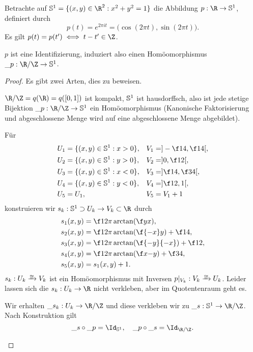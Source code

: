 \begin{ex}
	Betrachte auf $\S^1 = \{ (x,y) \in \R^2 : x^2 + y^2 = 1 \}$ die Abbildung $p: \R \to \S^1$, definiert durch
	\[
		p(t) = e^{2\pi i t} = \Big( \cos(2\pi t), \sin(2\pi t) \Big).
	\]
	Es gilt $p(t) = p(t') \iff t - t' \in \Z$.

	$p$ ist eine Identifizierung, induziert also einen Homöomorphismus $\_p : \R / \Z \to \S^1$.
	\begin{proof}
		Es gibt zwei Arten, dies zu beweisen.
		\begin{seg}
			$\R / \Z = q(\R) = q([0,1])$ ist kompakt, $\S^1$ ist hausdorffsch, also ist jede stetige Bijektion $\_p: \R / \Z \to \S^1$ ein Homöomorphismus (Kanonische Faktorisierung und abgeschlossene Menge wird auf eine abgeschlossene Menge abgebildet).
		\end{seg}
		\begin{seg}
			Für
			\begin{align*}
				U_1 &= \{ (x,y) \in \S^1 : x > 0 \},&
				V_1 &= ] - \f 14, \f 14 [, \\
				U_2 &= \{ (x,y) \in \S^1 : y > 0 \},&
				V_2 &= ] 0, \f 12 [, \\
				U_3 &= \{ (x,y) \in \S^1 : x < 0 \},&
				V_3 &= ] \f 14, \f 34 [, \\
				U_4 &= \{ (x,y) \in \S^1 : y < 0 \},&
				V_4 &= ] \f 12, 1 [, \\
				U_5 &= U_1,&
				V_5 &= V_1 + 1
			\end{align*}
			konstruieren wir $s_k: \S^1 \supset U_k \to V_k \subset \R$ durch
			\begin{align*}
				s_1(x,y) &= \f 1{2\pi} \arctan(\f yx), \\
				s_2(x,y) &= \f 1{2\pi} \arctan(\f {-x}y) + \f 14, \\
				s_3(x,y) &= \f 1{2\pi} \arctan(\f {-y}{-x}) + \f 12, \\
				s_4(x,y) &= \f 1{2\pi} \arctan(\f x{-y}) + \f 34, \\
				s_5(x,y) &= s_1(x,y) + 1.
			\end{align*}
			$s_k : U_k \homto V_k$ ist ein Homöomorphismus mit Inversen $p|_{V_k} : V_k \homto U_k$.
			Leider lassen sich die $s_k: U_k \to \R$ nicht verkleben, aber im Quotentenraum geht es.


			Wir erhalten $\_{s_k}: U_k \to \R / \Z$ und diese verkleben wir zu $\_s: \S^1 \to \R / \Z$.
			Nach Konstruktion gilt
			\[
				\_s \circ \_p = \Id_{\S^1}, \quad
				\_p \circ \_s = \Id_{\R / \Z}.
			\]
		\end{seg}
	\end{proof}
\end{ex}



